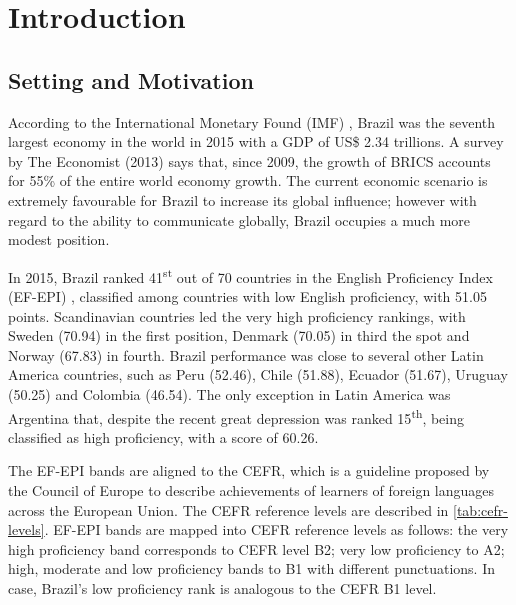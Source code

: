 \chapter{Introduction}\label{ch:introduction}

\section*{Setting and Motivation}

According to the International Monetary Found (IMF) \cite{IMF2015}, Brazil was the seventh largest economy in the world in 2015 with a GDP of US\$ 2.34 trillions. A survey by The Economist (2013) says that, since 2009, the growth of BRICS accounts for 55\% of the entire world economy growth. The current economic scenario is extremely favourable for Brazil to increase its global influence; however with regard to the ability to communicate globally, Brazil occupies a much more modest position. 

In 2015, Brazil ranked 41\textsuperscript{st} out of 70 countries in the English Proficiency Index (EF-EPI) \cite{EF2015}, classified among countries with low English proficiency, with 51.05 points. Scandinavian countries led the very high proficiency rankings, with Sweden (70.94) in the first position, Denmark (70.05) in third the spot and Norway (67.83) in fourth. Brazil performance was close to several other Latin America countries, such as Peru (52.46), Chile (51.88), Ecuador (51.67), Uruguay (50.25) and Colombia (46.54). The only exception in Latin America was Argentina that, despite the recent great depression was ranked 15\textsuperscript{th}, being classified as high proficiency, with a score of 60.26.

The \ac{EF-EPI} bands are aligned to the \ac{CEFR}, which is a guideline proposed by the Council of Europe to describe achievements of learners of foreign languages across the European Union. The \ac{CEFR} reference levels are described in \autoref{tab:cefr-levels}. \ac{EF-EPI} bands are mapped into \ac{CEFR} reference levels as follows: the very high proficiency band corresponds to \ac{CEFR} level B2; very low proficiency to A2; high, moderate and low proficiency bands to B1 with different punctuations. In case, Brazil's low proficiency rank is analogous to the \ac{CEFR} B1 level. 

